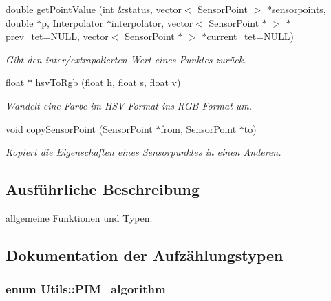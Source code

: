 \begin{DoxyCompactItemize}
double \hyperlink{namespaceUtils_a6a0ae18a42e2d206bc1b43da27820fe2}{get\-Point\-Value} (int \&status, \hyperlink{classstd_1_1vector}{vector}$<$ \hyperlink{structUtils_1_1SensorPoint}{Sensor\-Point} $>$ $\ast$sensorpoints, double $\ast$p, \hyperlink{classInterpolator}{Interpolator} $\ast$interpolator, \hyperlink{classstd_1_1vector}{vector}$<$ \hyperlink{structUtils_1_1SensorPoint}{Sensor\-Point} $\ast$ $>$ $\ast$prev\-\_\-tet=N\-U\-L\-L, \hyperlink{classstd_1_1vector}{vector}$<$ \hyperlink{structUtils_1_1SensorPoint}{Sensor\-Point} $\ast$ $>$ $\ast$current\-\_\-tet=N\-U\-L\-L)
\begin{DoxyCompactList}\small\item\em Gibt den inter/extrapolierten Wert eines Punktes zurück. \end{DoxyCompactList}\item 
float $\ast$ \hyperlink{namespaceUtils_a5d6523eb946892eee52c9c74efd016de}{hsv\-To\-Rgb} (float h, float s, float v)
\begin{DoxyCompactList}\small\item\em Wandelt eine Farbe im H\-S\-V-\/\-Format ins R\-G\-B-\/\-Format um. \end{DoxyCompactList}\item 
void \hyperlink{namespaceUtils_adc0438a85ca31977c95f5d27090d5346}{copy\-Sensor\-Point} (\hyperlink{structUtils_1_1SensorPoint}{Sensor\-Point} $\ast$from, \hyperlink{structUtils_1_1SensorPoint}{Sensor\-Point} $\ast$to)
\begin{DoxyCompactList}\small\item\em Kopiert die Eigenschaften eines Sensorpunktes in einen Anderen. \end{DoxyCompactList}\end{DoxyCompactItemize}


\subsection{Ausführliche Beschreibung}
allgemeine Funktionen und Typen. 

\subsection{Dokumentation der Aufzählungstypen}
\hypertarget{namespaceUtils_ad369b0127cabda0d6871ce1ae7e6c862}{
\subsubsection[{P\-I\-M\-\_\-algorithm}]{\setlength{\rightskip}{0pt plus 5cm}enum {\bf Utils\-::\-P\-I\-M\-\_\-algorithm}}}\label{namespaceUtils_ad369b0127cabda0d6871ce1ae7e6c862}


